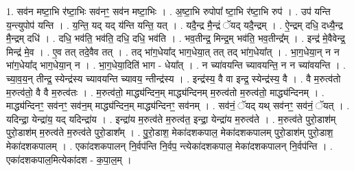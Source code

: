 \documentclass[17pt]{extarticle}
\begin{document}
1. सव॑न मष्टा॒भि र॑ष्टा॒भिः सव॑नꣳ॒॒ सव॑न मष्टा॒भिः । . अ॒ष्टा॒भि रुपोपा᳚ ष्टा॒भि र॑ष्टा॒भि रुप॑ । . उप॑ यन्ति य॒न्त्युपोप॑ यन्ति । . य॒न्ति॒ यद् यद् य॑न्ति यन्ति॒ यत् । . यदै॒न्द्र मै॒न्द्रं ॅयद् यदै॒न्द्रम् । . ऐ॒न्द्रम् दधि॒ दध्यै॒न्द्र मै॒न्द्रम् दधि॑ । . दधि॒ भव॑ति॒ भव॑ति॒ दधि॒ दधि॒ भव॑ति । . भव॒तीन्द्र॒ मिन्द्र॒म् भव॑ति॒ भव॒तीन्द्र᳚म् । . इन्द्र॑ मे॒वैवेन्द्र॒ मिन्द्र॑ मे॒व । . ए॒व तत् तदे॒वैव तत् । . तद् भा॑ग॒धेया᳚द् भाग॒धेया॒त् तत् तद् भा॑ग॒धेया᳚त् । . भा॒ग॒धेया॒न् न न भा॑ग॒धेया᳚द् भाग॒धेया॒न् न । . भा॒ग॒धेया॒दिति॑ भाग - धेया᳚त् । . न च्या॑वयन्ति च्यावयन्ति॒ न न च्या॑वयन्ति । . च्या॒व॒य॒न् तीन्द्र॒ स्येन्द्र॑स्य च्यावयन्ति च्यावय॒ न्तीन्द्र॑स्य । . इन्द्र॑स्य॒ वै वा इन्द्र॒ स्येन्द्र॑स्य॒ वै । . वै म॒रुत्व॑तो म॒रुत्व॑तो॒ वै वै म॒रुत्व॑तः । . म॒रुत्व॑तो॒ माद्ध्य॑न्दिन॒म् माद्ध्य॑न्दिनम् म॒रुत्व॑तो म॒रुत्व॑तो॒ माद्ध्य॑न्दिनम् । . माद्ध्य॑न्दिनꣳ॒॒ सव॑नꣳ॒॒ सव॑न॒म् माद्ध्य॑न्दिन॒म् माद्ध्य॑न्दिनꣳ॒॒ सव॑नम् । . सव॑नं॒ ॅयद् यथ् सव॑नꣳ॒॒ सव॑नं॒ ॅयत् । . यदिन्द्रा॒ येन्द्रा॑य॒ यद् यदिन्द्रा॑य । . इन्द्रा॑य म॒रुत्व॑ते म॒रुत्व॑त॒ इन्द्रा॒ येन्द्रा॑य म॒रुत्व॑ते । . म॒रुत्व॑ते पुरो॒डाश॑म् पुरो॒डाश॑म् म॒रुत्व॑ते म॒रुत्व॑ते पुरो॒डाश᳚म् । . पु॒रो॒डाश॒ मेका॑दशकपाल॒ मेका॑दशकपालम् पुरो॒डाश॑म् पुरो॒डाश॒ मेका॑दशकपालम् । . एका॑दशकपालन् नि॒र्वप॑न्ति नि॒र्वप॒ न्त्येका॑दशकपाल॒ मेका॑दशकपालन् नि॒र्वप॑न्ति । . एका॑दशकपाल॒मित्येका॑दश - क॒पा॒ल॒म् । \newline
\end{document}
